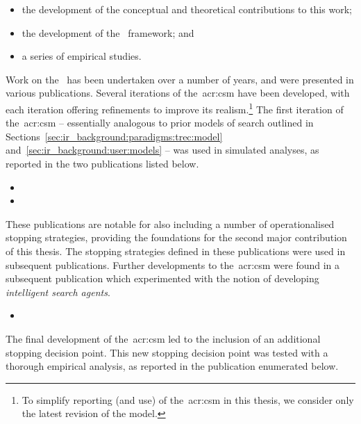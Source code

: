 \begin{itemize}
    \item{the development of the conceptual and theoretical contributions to this work;}
    \item{the development of the \simiir~framework; and}
    \item{a series of empirical studies.}
\end{itemize}

\noindent
{}
Work on the~ has been undertaken over a number of years, and were presented in various publications. Several iterations of the~\gls{acr:csm} have been developed, with each iteration offering refinements to improve its realism.\footnote{To simplify reporting (and use) of the~\gls{acr:csm} in this thesis, we consider only the latest revision of the model.} The first iteration of the~\gls{acr:csm} -- essentially analogous to prior models of search outlined in Sections~\ref{sec:ir_background:paradigms:trec:model} and~\ref{sec:ir_background:user:models} -- was used in simulated analyses, as reported in the two publications listed below.

\begin{itemize}
    \item{}
    \item{}
\end{itemize}

These publications are notable for also including a number of operationalised stopping strategies, providing the foundations for the second major contribution of this thesis. The stopping strategies defined in these publications were used in subsequent publications. Further developments to the~\gls{acr:csm} were found in a subsequent publication which experimented with the notion of developing \emph{intelligent search agents}.

\begin{itemize}
    \item{}
\end{itemize}

The final development of the~\gls{acr:csm} led to the inclusion of an additional stopping decision point. This new stopping decision point was tested with a thorough empirical analysis, as reported in the publication enumerated below.


